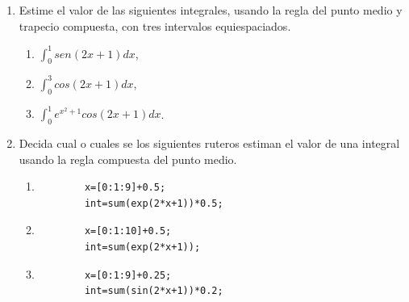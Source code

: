 \documentclass[11pt]{article}
\begin{document}
\begin{enumerate}
\begin{multicols}{2}
\begin{enumerate}
    \item $cos(x)y''+sen(x)y'=0$.
\end{enumerate}
\end{multicols}
\item Estime el valor de las siguientes integrales, usando la regla del punto medio y trapecio compuesta, con tres intervalos equiespaciados.
\begin{multicols}{3}
\begin{enumerate}
	\item $\displaystyle\int_0^1 sen(2x+1) dx$, 
    \item $\displaystyle\int_0^3 cos(2x+1) dx$,
    \item $\displaystyle\int_0^1 e^{x^2+1}cos(2x+1) dx$.
\end{enumerate}
\end{multicols}
\item Decida cual o cuales se los siguientes ruteros estiman el valor de una integral usando la regla compuesta del punto medio.
\begin{multicols}{2}
\begin{enumerate}
	\item
    	\begin{lstlisting}
        x=[0:1:9]+0.5;
        int=sum(exp(2*x+1))*0.5;
        \end{lstlisting}
        
   	\item
    	\begin{lstlisting}
        x=[0:1:10]+0.5;
        int=sum(exp(2*x+1));
        \end{lstlisting}
        
   \item
    	\begin{lstlisting}
        x=[0:1:9]+0.25;
        int=sum(sin(2*x+1))*0.2;
        \end{lstlisting}
        

\end{enumerate}
\end{multicols}
\end{enumerate}
\end{document}
